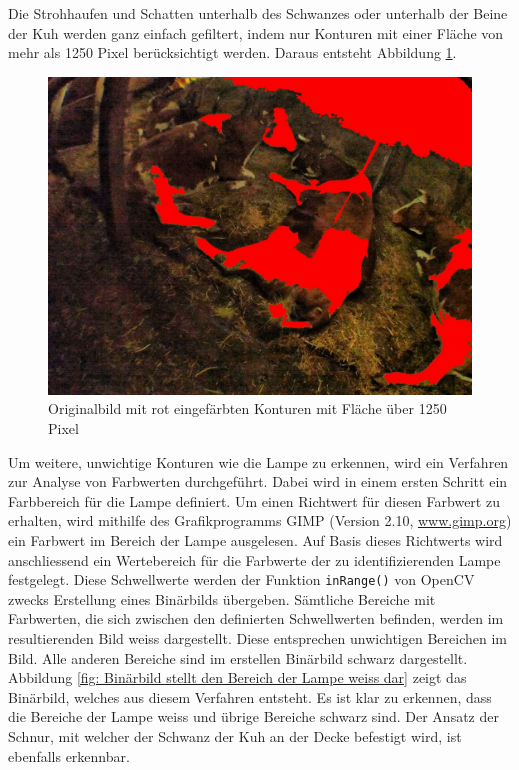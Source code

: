 Die Strohhaufen und Schatten unterhalb des Schwanzes oder unterhalb der Beine der Kuh werden ganz einfach gefiltert, indem nur Konturen mit einer Fläche von mehr als 1250 Pixel berücksichtigt werden. Daraus entsteht Abbildung \ref{fig:Originalbild mit rot eingefärbten Konturen, falls Fläche über 1250 Pixel}.

\begin{figure}[H]
	\center
	\includegraphics[scale=0.43]{Grafiken/entwicklung/9thresholdedImage.jpg}
	\caption{Originalbild mit rot eingefärbten Konturen mit Fläche über 1250 Pixel} 
	\label{fig:Originalbild mit rot eingefärbten Konturen, falls Fläche über 1250 Pixel} 
\end{figure}

Um weitere, unwichtige Konturen wie die Lampe zu erkennen, wird ein Verfahren zur Analyse von Farbwerten durchgeführt.
Dabei wird in einem ersten Schritt ein Farbbereich für die Lampe definiert. Um einen Richtwert für diesen Farbwert zu erhalten, wird mithilfe des Grafikprogramms GIMP (Version 2.10, \url{www.gimp.org}) ein Farbwert im Bereich der Lampe ausgelesen. Auf Basis dieses Richtwerts wird anschliessend ein Wertebereich für die Farbwerte der zu identifizierenden Lampe festgelegt. Diese Schwellwerte werden der Funktion \texttt{inRange()} von OpenCV zwecks Erstellung eines Binärbilds übergeben. Sämtliche Bereiche mit Farbwerten, die sich zwischen den definierten Schwellwerten befinden, werden im resultierenden Bild weiss dargestellt. Diese entsprechen unwichtigen Bereichen im Bild. Alle anderen Bereiche sind im erstellen Binärbild schwarz dargestellt. Abbildung \ref{fig: Binärbild stellt den Bereich der Lampe weiss dar} zeigt das Binärbild, welches aus diesem Verfahren entsteht. Es ist klar zu erkennen, dass die Bereiche der Lampe weiss und übrige Bereiche schwarz sind. Der Ansatz der Schnur, mit welcher der Schwanz der Kuh an der Decke befestigt wird, ist ebenfalls erkennbar. 




